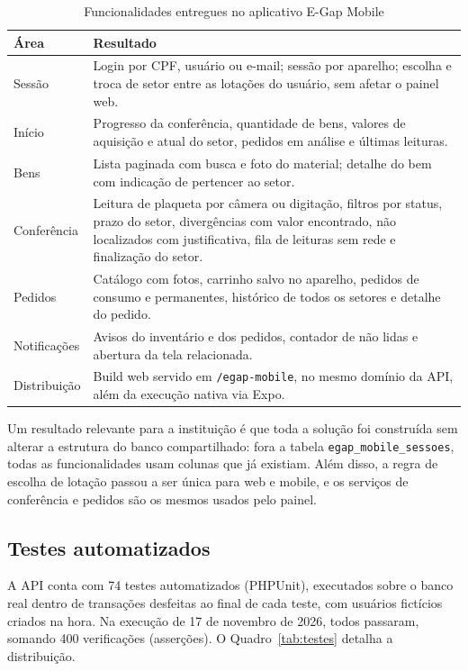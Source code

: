 \documentclass[12pt,a4paper]{article}
\begin{document}
\begin{table}[H]
\centering
\caption{Funcionalidades entregues no aplicativo E-Gap Mobile}
\label{tab:funcionalidades}
\begin{tabularx}{\textwidth}{L{3.4cm}Y}
\toprule
\textbf{Área} & \textbf{Resultado} \\
\midrule
Sessão & Login por CPF, usuário ou e-mail; sessão por aparelho; escolha e troca de setor entre as lotações do usuário, sem afetar o painel web. \\
Início & Progresso da conferência, quantidade de bens, valores de aquisição e atual do setor, pedidos em análise e últimas leituras. \\
Bens & Lista paginada com busca e foto do material; detalhe do bem com indicação de pertencer ao setor. \\
Conferência & Leitura de plaqueta por câmera ou digitação, filtros por status, prazo do setor, divergências com valor encontrado, não localizados com justificativa, fila de leituras sem rede e finalização do setor. \\
Pedidos & Catálogo com fotos, carrinho salvo no aparelho, pedidos de consumo e permanentes, histórico de todos os setores e detalhe do pedido. \\
Notificações & Avisos do inventário e dos pedidos, contador de não lidas e abertura da tela relacionada. \\
Distribuição & Build web servido em \texttt{/egap-mobile}, no mesmo domínio da API, além da execução nativa via Expo. \\
\bottomrule
\end{tabularx}
\end{table}

Um resultado relevante para a instituição é que toda a solução foi construída sem alterar a estrutura do banco compartilhado: fora a tabela \texttt{egap\_mobile\_sessoes}, todas as funcionalidades usam colunas que já existiam. Além disso, a regra de escolha de lotação passou a ser única para web e mobile, e os serviços de conferência e pedidos são os mesmos usados pelo painel.

\subsection{Testes automatizados}

A API conta com 74 testes automatizados (PHPUnit), executados sobre o banco real dentro de transações desfeitas ao final de cada teste, com usuários fictícios criados na hora. Na execução de 17 de novembro de 2026, todos passaram, somando 400 verificações (asserções). O Quadro~\ref{tab:testes} detalha a distribuição.
\end{document}
